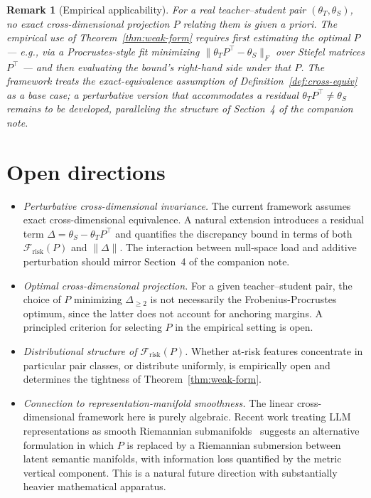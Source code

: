 \documentclass{article}
\newtheorem{remark}[theorem]{Remark}
\newcommand{\Frisk}{\mathcal{F}_{\mathrm{risk}}}
\begin{document}
\begin{remark}[Empirical applicability]
	\label{rem:empirical}
	For a real teacher--student pair $(\theta_T, \theta_S)$, no exact cross-dimensional projection $P$ relating them is given a priori. The empirical use of Theorem~\ref{thm:weak-form} requires first estimating the optimal $P$ --- e.g., via a Procrustes-style fit minimizing $\|\theta_T P^\top - \theta_S\|_F$ over Stiefel matrices $P^\top$ --- and then evaluating the bound's right-hand side under that $P$. The framework treats the exact-equivalence assumption of Definition~\ref{def:cross-equiv} as a base case; a perturbative version that accommodates a residual $\theta_T P^\top \neq \theta_S$ remains to be developed, paralleling the structure of Section~4 of the companion note.
\end{remark}

\section{Open directions}
\label{sec:open}

\begin{itemize}
	\item \emph{Perturbative cross-dimensional invariance.} The current framework assumes exact cross-dimensional equivalence. A natural extension introduces a residual term $\Delta = \theta_S - \theta_T P^\top$ and quantifies the discrepancy bound in terms of both $\Frisk(P)$ and $\|\Delta\|$. The interaction between null-space load and additive perturbation should mirror Section~4 of the companion note.

	\item \emph{Optimal cross-dimensional projection.} For a given teacher--student pair, the choice of $P$ minimizing $\Delta_{\geq 2}$ is not necessarily the Frobenius-Procrustes optimum, since the latter does not account for anchoring margins. A principled criterion for selecting $P$ in the empirical setting is open.

	\item \emph{Distributional structure of $\Frisk(P)$.} Whether at-risk features concentrate in particular pair classes, or distribute uniformly, is empirically open and determines the tightness of Theorem~\ref{thm:weak-form}.

	\item \emph{Connection to representation-manifold smoothness.} The linear cross-dimensional framework here is purely algebraic. Recent work treating LLM representations as smooth Riemannian submanifolds~\citep{mabrok_2026} suggests an alternative formulation in which $P$ is replaced by a Riemannian submersion between latent semantic manifolds, with information loss quantified by the metric vertical component. This is a natural future direction with substantially heavier mathematical apparatus.
\end{itemize}
\end{document}
